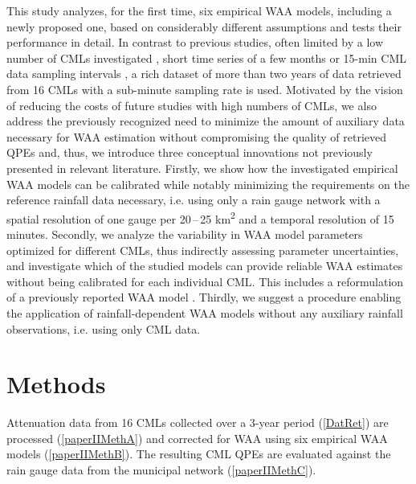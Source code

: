 \documentclass{ctuthesis}\usepackage[]{graphicx}\usepackage[]{color}
\begin{document}
This study analyzes, for the first time, six empirical WAA models, including a newly proposed one, based on considerably different assumptions and tests their performance in detail. In contrast to previous studies, often limited by a low number of CMLs investigated \citep{schleissQuantificationModelingWetAntenna2013, leijnseMicrowaveLinkRainfall2008, lethMeasurementCampaignAssess2018}, short time series of a few months \citep{leijnseMicrowaveLinkRainfall2008, overeemMeasuringUrbanRainfall2011, roversiCommercialMicrowaveLinks2020} or 15-min CML data sampling intervals \citep{overeemMeasuringUrbanRainfall2011, riosgaonaRainfallRetrievalCommercial2018}, a rich dataset of more than two years of data retrieved from 16 CMLs with a sub-minute sampling rate is used. Motivated by the vision of reducing the costs of future studies with high numbers of CMLs, we also address the previously recognized need \citep{ostrometzkyWetAntennaEffectFactor2018, grafRainfallEstimationGermanwide2020} to minimize the amount of auxiliary data necessary for WAA estimation without compromising the quality of retrieved QPEs and, thus, we introduce three conceptual innovations not previously presented in relevant literature. Firstly, we show how the investigated empirical WAA models can be calibrated while notably minimizing the requirements on the reference rainfall data necessary, i.e. using only a rain gauge network with a spatial resolution of one gauge per 20\,--\,25 km\textsuperscript{2} and a temporal resolution of 15 minutes. Secondly, we analyze the variability in WAA model parameters optimized for different CMLs, thus indirectly assessing parameter uncertainties, and investigate which of the studied models can provide reliable WAA estimates without being calibrated for each individual CML. This includes a reformulation of a previously reported WAA model \citep{valtrExcessAttenuationCaused2019}. Thirdly, we suggest a procedure enabling the application of rainfall-dependent WAA models without any auxiliary rainfall observations, i.e. using only CML data.

 
\section{Methods} \label{paperIIMeth}

Attenuation data from 16 CMLs collected over a 3-year period (\ref{DatRet}) are processed (\ref{paperIIMethA}) and corrected for WAA using six empirical WAA models (\ref{paperIIMethB}). The resulting CML QPEs are evaluated against the rain gauge data from the municipal network (\ref{paperIIMethC}). 
\end{document}

